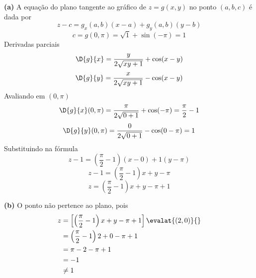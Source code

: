 \documentclass[a4paper,12pt,fleqn]{article}
\begin{document}
\begin{answer}
  
  
  \hrulefill
  
  \hrulefill
  
    \textbf{(a)}
    A equação do plano tangente ao gráfico de \(z = g(x, y)\) no ponto
    \(
      (a, b, c)
    \)
    é dada por
    \[
      z - c = g_x(a, b)(x - a) + g_y(a, b)(y - b)
    \]
    \[
      c
      = g(0, \pi)
      = \sqrt{1} + \sin(-\pi)
      = 1
    \]
    Derivadas parciais
    \[
      \D{g}{x}
      = \frac{y}{2\sqrt{xy+1}} + \cos(x-y)
    \]
    \[
      \D{g}{y}
      = \frac{x}{2\sqrt{xy+1}} - \cos(x-y)
    \]
    Avaliando em \((0, \pi)\)
    \[
      \D{g}{x}(0, \pi)
      = \frac{\pi}{2\sqrt{0+1}} + \cos(-\pi)
      = \frac{\pi}{2} - 1
    \]
    \[
      \D{g}{y}(0, \pi)
      = \frac{0}{2\sqrt{0+1}} - \cos(0-\pi)
      = 1
    \]
    Substituindo na fórmula
    \[
      z - 1
      = \left( \frac{\pi}{2} - 1 \right)(x-0)
      + 1 (y-\pi)
    \]
    \[
      z - 1
      = \left( \frac{\pi}{2} - 1 \right)x
      + y -\pi
    \]
    \[
      z
      = \left( \frac{\pi}{2} - 1 \right)x
      + y -\pi +1
    \]
  
    \bigskip
    \textbf{(b)}
    O ponto não pertence ao plano, pois
    \begin{align*}
      z
      & = \left[\left( \frac{\pi}{2} - 1 \right)x + y -\pi +1\right]\evalat{(2, 0)}{} \\
      & = \left( \frac{\pi}{2} - 1 \right)2 + 0 -\pi +1 \\
      & = \pi - 2 -\pi +1 \\
      & = -1 \\
      & \neq 1
    \end{align*}
\end{answer}

\end{document}
